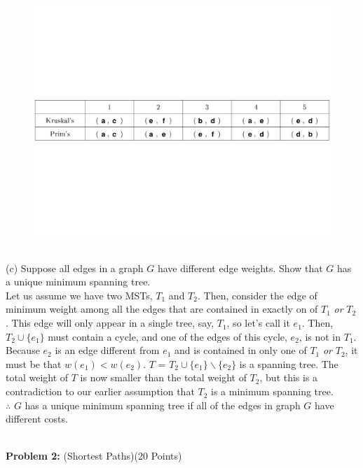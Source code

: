 \documentclass[11pt]{amsart}
\begin{document}
\begin{figure}[htb]
\begin{center}
\includegraphics[width=17cm]{MSTb.pdf}
\end{center}
\end{figure}
\newpage
\hrulefill \\

(c) Suppose all edges in a graph $G$ have different edge weights. Show that $G$ has a unique minimum spanning tree.\\
Let us assume we have two MSTs, $T_1$ and $T_2$. Then, consider the edge of minimum weight among all the edges that are contained in exactly on of $T_1$ \emph{or} $T_2$. This edge will only appear in a single tree, say, $T_1$, so let's call it $e_1$. Then, $T_2 \cup \{ e_1 \}$ must contain a cycle, and one of the edges of this cycle, $e_2$, is not in $T_1$.\\
Because $e_2$ is an edge different from $e_1$ and is contained in only one of $T_1$ \emph{or} $T_2$, it must be that $w(e_1) < w(e_2)$. $T$ = $T_2 \cup \{ e_1 \} \backslash \{ e_2 \}$ is a spanning tree. The total weight of $T$ is now smaller than the total weight of $T_2$, but this is a contradiction to our earlier assumption that $T_2$ is a minimum spanning tree.\\
$\therefore$ $G$ has a unique minimum spanning tree if all of the edges in graph $G$ have different costs.

\newpage
\hrulefill \\


\textbf{Problem 2:} (Shortest Paths)\hfill (20 Points)\\
\end{document}
